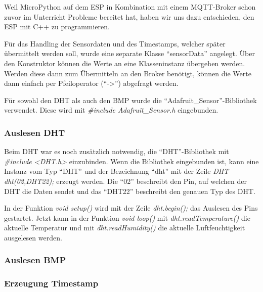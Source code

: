 Weil MicroPython auf dem ESP in Kombination mit einem MQTT-Broker schon 
zuvor im Unterricht Probleme bereitet hat, haben wir uns dazu entschieden, den ESP mit C++ zu programmieren.

Für das Handling der Sensordaten und des Timestamps, welcher später übermittelt werden soll, wurde eine separate Klasse "`sensorData"' angelegt.
Über den Konstruktor können die Werte an eine Klasseninstanz übergeben werden. 
Werden diese dann zum Übermitteln an den Broker benötigt, können die Werte dann einfach per Pfeiloperator ("`->"') abgefragt werden.

Für sowohl den DHT als auch den BMP wurde die "`Adafruit\_Sensor"'-Bibliothek verwendet.
Diese wird mit \textit{\#include Adafruit\_Sensor.h} eingebunden.

\subsubsection{Auslesen DHT}
	Beim DHT war es noch zusätzlich notwendig, die "`DHT"'-Bibliothek mit \textit{\#include <DHT.h>} einzubinden.
	Wenn die Bibliothek eingebunden ist, kann eine Instanz vom Typ "`DHT"' und der Bezeichnung "`dht"' mit der Zeile \textit{DHT dht(02,DHT22);} erzeugt werden.
	Die "`02"' beschreibt den Pin, auf welchen der DHT die Daten sendet und das "`DHT22"' beschreibt den genauen Typ des DHT.
	
	In der Funktion \textit{void setup()} wird mit der Zeile \textit{dht.begin();} das Auslesen des Pins gestartet. 
	Jetzt kann in der Funktion \textit{void loop()} mit \textit{dht.readTemperature()} die aktuelle Temperatur und mit \textit{dht.readHumidity()}
	die aktuelle Luftfeuchtigkeit ausgelesen werden.
	
\subsubsection{Auslesen BMP}

\subsubsection{Erzeugung Timestamp}